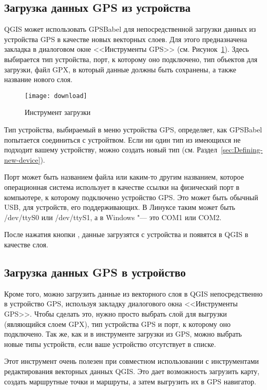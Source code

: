 \subsection{Загрузка данных GPS из устройства}

QGIS может использовать GPSBabel для непосредственной загрузки данных из
устройства GPS в качестве новых векторных слоев. Для этого предназначена
закладка  в диалоговом окне <<Инструменты GPS>>
(см. Рисунок~\ref{figure_download}). Здесь выбирается тип устройства,
порт, к которому оно подключено, тип объектов для загрузки, файл GPX, в
который данные должны быть сохранены, а также название нового слоя.

\begin{figure}[ht]
   \centering
   \texttt{[image: download]}
   \caption{Инструмент загрузки \nixcaption}\label{figure_download}
\end{figure}

Тип устройства, выбираемый в меню устройства GPS, определяет, как
GPSBabel попытается соединиться с устройтвом. Если ни один тип из
имеющихся не подходит вашему устройству, можно создать новый тип
(см. Раздел~\ref{sec:Defining-new-device}).

Порт может быть названием файла или каким-то другим названием, которое
операционная система использует в качестве ссылки на физический порт в
компьютере, к которому подключено устройство GPS. Это может быть
обычный USB, для устройств, его поддерживающих.
\nix В Линуксе таким может быть /dev/ttyS0 или /dev/ttyS1, а в
\win Windows "--- это COM1 или COM2.

После нажатия кнопки , данные загрузятся с устройства и
появятся в QGIS в качестве слоя.

\subsection{Загрузка данных GPS в устройство}

Кроме того, можно загрузить данные из векторного слоя в QGIS
непосредственно в устройство GPS, используя закладку 
диалогового окна <<Инструменты GPS>>. Чтобы сделать это, нужно просто
выбрать слой для выгрузки (являющийся слоем GPX), тип устройства GPS и
порт, к которому оно подключено. Так же, как и в инструменте загрузки
из GPS, можно выбрать новые типы устройств, если ваше устройство
отсутствует в списке.

Этот инструмент очень полезен при совместном использовании с
инструментами редактирования векторных данных QGIS. Это дает возможность
загрузить карту, создать маршрутные точки и маршруты, а затем выгрузить
их в GPS навигатор.

